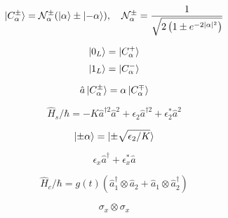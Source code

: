 \documentclass{article}
\begin{document}
\[
    \ket{C_\alpha^\pm} = \mathcal{N}_\alpha^\pm (\ket{\alpha} \pm \ket{-\alpha}), \quad \mathcal{N}_\alpha^\pm = \frac {1} {\sqrt{2 \left ( 1 \pm e^{-2 |\alpha|^2} \right )}}
\]

\[
    \ket{0_L} = \ket{C_\alpha^+}
\]
\[
    \ket{1_L} = \ket{C_\alpha^-}
\]

\[
    \hat{a} \ket{C_\alpha^\pm} = \alpha \ket{C_\alpha^\mp}
\]

\[
    \hat{H}_s / \hbar = -K \hat{a}^{\dag 2} \hat{a}^2 + \epsilon_2 \hat{a}^{\dag 2} + \epsilon_2^* \hat{a}^2
\]

\[
    \ket{\pm \alpha }= \ket{\pm \sqrt{\epsilon_2 / K}}
\]

\[
    \epsilon_x \hat{a}^\dag + \epsilon_x^* \hat{a}
\]

\[
    \hat{H}_c / \hbar = g(t) (\hat{a}_1^\dag \otimes \hat{a}_2 + \hat{a}_1 \otimes \hat{a}_2^\dag)
\]

\[
    \sigma_x \otimes \sigma_x
\]
\end{document}
